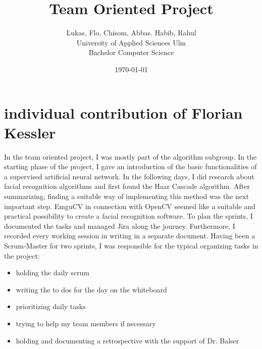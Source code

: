\documentclass[12pt, a4paper]{article}
\title{Team Oriented Project}
\author{Lukas, Flo, Chisom, Abbas. Habib, Rahul \\
	University of Applied Sciences Ulm  \\
	Bachelor Computer Science 
	}
\date{\today}
\begin{document}
\maketitle

\newpage
\section{individual contribution of Florian Kessler}
In the team oriented project, I was mostly part of the algorithm subgroup. In the starting phase of the project, I gave an introduction of the basic functionalities of a supervised artificial neural network. In the following days, I did research about facial recognition algorithms and first found the Haar Cascade algorithm. After summarizing, finding a suitable way of implementing this method was the next important step. EmguCV in connection with OpenCV seemed like a suitable and practical possibility to create a facial recognition software. To plan the sprints, I documented the tasks and managed Jira along the journey. Furthermore, I recorded every working session in writing in a separate document. Having been a Scrum-Master for two sprints, I was responsible for the typical organizing tasks in the project:
\begin{itemize}
\item holding the daily scrum
\item writing the to dos for the day on the whiteboard
\item prioritizing daily tasks
\item trying to help my team members if necessary
\item holding and documenting a retrospective with the support of Dr. Balser
\end{itemize}
\end{document}
